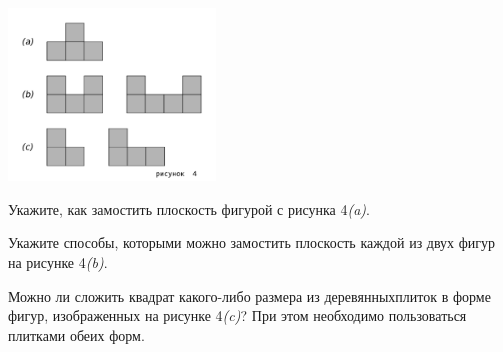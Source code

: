 ﻿
\vspace{-0.7cm}
\centerline{\includegraphics[width=5.5cm]{stats/2018/images/plane-park}}

\begin{enumerate}
\itA Укажите, как замостить плоскость фигурой с рисунка 4{\itshape (a)}.

\itB Укажите способы, которыми можно замостить плоскость каждой из двух фигур на рисунке 4{\itshape (b)}.

\itC Можно ли сложить квадрат какого-либо размера из деревянных\linebreak плиток в форме фигур, изображенных на рисунке 4{\itshape (c)}? При этом необходимо пользоваться плитками обеих форм.
\end{enumerate}